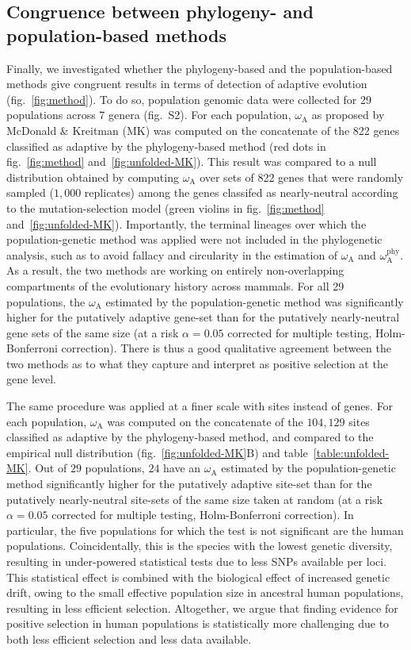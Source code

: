 \documentclass{article}
\newcommand{\rateApop}{\omega_{\mathrm{A}}}
\newcommand{\rateAphy}{\rateApop^{\mathrm{phy}}}
\begin{document}
    \subsection*{Congruence between phylogeny- and population-based methods}
    Finally, we investigated whether the phylogeny-based and the population-based methods give congruent results in terms of detection of adaptive evolution (fig.~\ref{fig:method}).
    To do so, population genomic data were collected for 29 populations across 7 genera (fig.~S2).
    For each population, $\rateApop$ as proposed by McDonald \& Kreitman (MK)\cite{mcdonald_adaptative_1991} was computed on the concatenate of the 822 genes classified as adaptive by the phylogeny-based method (red dots in fig.~\ref{fig:method} and~\ref{fig:unfolded-MK}).
    This result was compared to a null distribution obtained by computing $\rateApop$ over sets of 822 genes that were randomly sampled ($1,000$ replicates) among the genes classifed as nearly-neutral according to the mutation-selection model (green violins in fig.~\ref{fig:method} and~\ref{fig:unfolded-MK}).
    Importantly, the terminal lineages over which the population-genetic method was applied were not included in the phylogenetic analysis, such as to avoid fallacy and circularity in the estimation of $\rateApop$ and $\rateAphy$.
    As a result, the two methods are working on entirely non-overlapping compartments of the evolutionary history across mammals.
    For all 29 populations, the $\rateApop$ estimated by the population-genetic method was significantly higher for the putatively adaptive gene-set than for the putatively nearly-neutral gene sets of the same size (at a risk $\alpha=0.05$ corrected for multiple testing, Holm-Bonferroni correction).
    There is thus a good qualitative agreement between the two methods as to what they capture and interpret as positive selection at the gene level.

    The same procedure was applied at a finer scale with sites instead of genes.
    For each population, $\rateApop$ was computed on the concatenate of the $104,129$ sites classified as adaptive by the phylogeny-based method, and compared to the empirical null distribution (fig.~\ref{fig:unfolded-MK}B) and table~\ref{table:unfolded-MK}.
    Out of $29$ populations, $24$ have an $\rateApop$ estimated by the population-genetic method significantly higher for the putatively adaptive site-set than for the putatively nearly-neutral site-sets of the same size taken at random (at a risk $\alpha=0.05$ corrected for multiple testing, Holm-Bonferroni correction).
    In particular, the five populations for which the test is not significant are the human populations.
    Coincidentally, this is the species with the lowest genetic diversity, resulting in under-powered statistical tests due to less SNPs available per loci.
    This statistical effect is combined with the biological effect of increased genetic drift, owing to the small effective population size in ancestral human populations, resulting in less efficient selection.
    Altogether, we argue that finding evidence for positive selection in human populations is statistically more challenging due to both less efficient selection and less data available.
\end{document}
